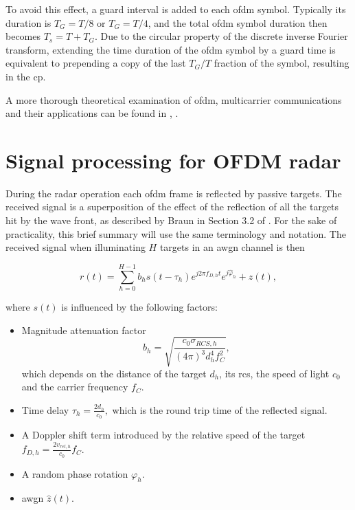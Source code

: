 To avoid this effect, a guard interval is added to each \gls{ofdm} symbol. Typically its duration is $T_G = T/8$ or $T_G = T/4$, and the total \gls{ofdm} symbol duration then becomes $T_s = T + T_G$.
Due to the circular property of the discrete inverse Fourier transform, extending the time duration of the \gls{ofdm} symbol by a guard time is equivalent to prepending a copy of the last $T_G/T$ fraction of the symbol, resulting in the \gls{cp}.


A more thorough theoretical examination of \gls{ofdm}, multicarrier communications and their applications can be found in \cite{OFDMWireless}, \cite{Proakis_2001}.


\section{Signal processing for OFDM radar}
\label{sec:OFDM_radar_theory}
        
    During the radar operation each \gls{ofdm} frame is reflected by passive targets. The received signal is a superposition of the effect of the reflection of all the targets hit by the wave front, as described by Braun in Section 3.2 of \cite{Braun2014OFDMRA}. For the sake of practicality, this brief summary will use the same terminology and notation.
    The received signal when illuminating $H$ targets in an \gls{awgn} channel is then
    
    \begin{equation}
    \label{eq:received_signal_mltiple_targets}
        r(t) = \sum_{h=0}^{H-1} b_h s(t-\tau_h)e^{j2\pi f_{D,h}t}e^{j\hat{\varphi}_h} + z(t),
    \end{equation}
    
    where $s(t)$ is influenced by the following factors:
    
    \begin{itemize}
        \item Magnitude attenuation factor $$b_h = \sqrt{\frac{c_0\sigma_{RCS,h}}{(4\pi)^3 d_h^4f_C^2}},$$
    which depends on the distance of the target $d_h$, its \gls{rcs}, the speed of light $c_0$ and the carrier frequency $f_C$.
    
        \item Time delay $\tau_h = \frac{2d_h}{c_0},$ which is the round trip time of the reflected signal.
    
        \item A Doppler shift term introduced by the relative speed of the target $f_{D,h} = \frac{2v_{rel,h}}{c_0}f_C$.
        \item A random phase rotation $\varphi_h$.
        \item \gls{awgn} $\hat{z}(t)$.
    \end{itemize}
    
